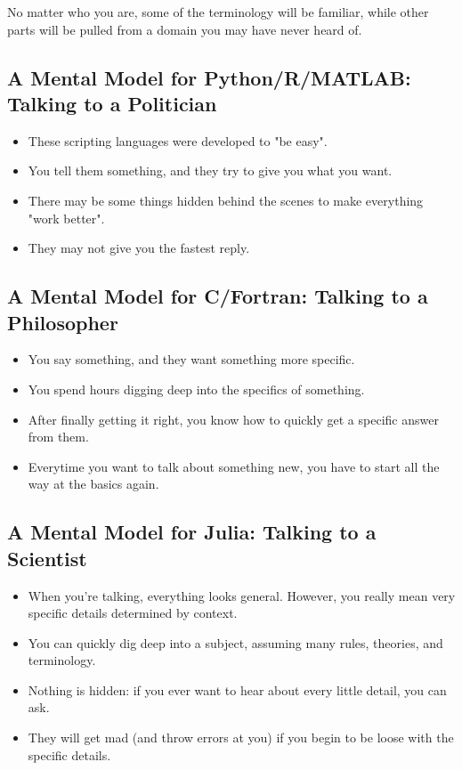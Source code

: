 \documentclass[11pt]{article}
\providecommand{\tightlist}{%
      \setlength{\itemsep}{0pt}\setlength{\parskip}{0pt}}
\begin{document}
No matter who you are, some of the terminology will be familiar, while
other parts will be pulled from a domain you may have never heard of.

    \subsection{A Mental Model for Python/R/MATLAB: Talking to a
Politician}\label{a-mental-model-for-pythonrmatlab-talking-to-a-politician}

\begin{itemize}
\tightlist
\item
  These scripting languages were developed to "be easy".
\item
  You tell them something, and they try to give you what you want.
\item
  There may be some things hidden behind the scenes to make everything
  "work better".
\item
  They may not give you the fastest reply.
\end{itemize}

    \subsection{A Mental Model for C/Fortran: Talking to a
Philosopher}\label{a-mental-model-for-cfortran-talking-to-a-philosopher}

\begin{itemize}
\tightlist
\item
  You say something, and they want something more specific.
\item
  You spend hours digging deep into the specifics of something.
\item
  After finally getting it right, you know how to quickly get a specific
  answer from them.
\item
  Everytime you want to talk about something new, you have to start all
  the way at the basics again.
\end{itemize}

    \subsection{A Mental Model for Julia: Talking to a
Scientist}\label{a-mental-model-for-julia-talking-to-a-scientist}

\begin{itemize}
\tightlist
\item
  When you're talking, everything looks general. However, you really
  mean very specific details determined by context.
\item
  You can quickly dig deep into a subject, assuming many rules,
  theories, and terminology.
\item
  Nothing is hidden: if you ever want to hear about every little detail,
  you can ask.
\item
  They will get mad (and throw errors at you) if you begin to be loose
  with the specific details.
\end{itemize}
\end{document}
